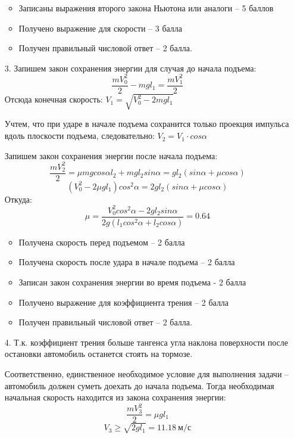\begin{enumerate}
    \begin{itemize}
        \item Записаны выражения второго закона Ньютона или аналоги – 5 баллов
        \item Получено выражение для скорости – 3 балла
        \item Получен правильный числовой ответ – 2 балла.
    \end{itemize}

    \item[3.] 	Запишем закон сохранения энергии для случая до начала подъема:
    $$\frac{mV_0^2}{2}-mgl_1=\frac{mV_1^2}{2}$$
    Отсюда конечная скорость: $V_1=\sqrt{V_0^2-2mgl_1}$

    Учтем, что при ударе в начале подъема сохранится только проекция импульса вдоль плоскости подъема, следовательно: $V_2 = V_1 \cdot cos\alpha $

    Запишем закон сохранения энергии после начала подъема:
    $$\frac{mV_2^2}{2}=\mu mg cos\alpha  l_2+mgl_2  sin\alpha =gl_2 (sin\alpha +\mu  cos\alpha  )$$
    $$(V_0^2-2\mu gl_1 )  cos^2\alpha =2gl_2 (sin\alpha +\mu  cos\alpha )$$
    Откуда:
    $$\mu =\frac{V_0^2  cos^2\alpha -2gl_2  sin\alpha}{2g(l_1  cos^2\alpha +l_2  cos\alpha )}=0.64$$

    \markSection

    \begin{itemize}
        \item Получена скорость перед подъемом – 2 балла
        \item Получена скорость после удара в начале подъема – 2 балла
        \item Записан закон сохранения энергии во время подъема - 2 балла
        \item Получено выражение для коэффициента трения – 2 балла
        \item Получен правильный числовой ответ – 2 балла.
    \end{itemize}

    \item[4.] Т.к. коэффициент трения больше тангенса угла наклона поверхности после остановки автомобиль останется стоять на тормозе.

    Соответственно, единственное необходимое условие для выполнения задачи – автомобиль должен суметь доехать до начала подъема. Тогда необходимая начальная скорость находится из закона сохранения энергии:
    $$\frac{mV_3^2}{2}= \mu gl_1$$
    $$V_3 \geq \sqrt{2gl_1}=11.18 \: \text{м/с}$$


\end{enumerate}
